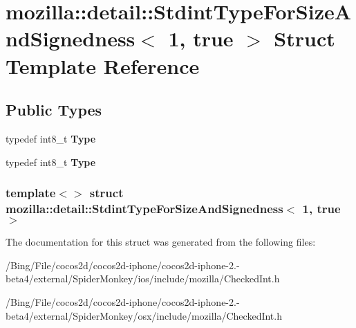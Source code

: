 \hypertarget{structmozilla_1_1detail_1_1_stdint_type_for_size_and_signedness_3_011_00_01true_01_4}{\section{mozilla\-:\-:detail\-:\-:Stdint\-Type\-For\-Size\-And\-Signedness$<$ 1, true $>$ Struct Template Reference}
\label{structmozilla_1_1detail_1_1_stdint_type_for_size_and_signedness_3_011_00_01true_01_4}
}
\subsection*{Public Types}
\begin{DoxyCompactItemize}
\item 
\hypertarget{structmozilla_1_1detail_1_1_stdint_type_for_size_and_signedness_3_011_00_01true_01_4_aefa63ece3683fa4aa9eeabbbde885f72}{typedef int8\-\_\-t {\bfseries Type}}\label{structmozilla_1_1detail_1_1_stdint_type_for_size_and_signedness_3_011_00_01true_01_4_aefa63ece3683fa4aa9eeabbbde885f72}

\item 
\hypertarget{structmozilla_1_1detail_1_1_stdint_type_for_size_and_signedness_3_011_00_01true_01_4_aefa63ece3683fa4aa9eeabbbde885f72}{typedef int8\-\_\-t {\bfseries Type}}\label{structmozilla_1_1detail_1_1_stdint_type_for_size_and_signedness_3_011_00_01true_01_4_aefa63ece3683fa4aa9eeabbbde885f72}

\end{DoxyCompactItemize}
\subsubsection*{template$<$$>$ struct mozilla\-::detail\-::\-Stdint\-Type\-For\-Size\-And\-Signedness$<$ 1, true $>$}



The documentation for this struct was generated from the following files\-:\begin{DoxyCompactItemize}
\item 
/\-Bing/\-File/cocos2d/cocos2d-\/iphone/cocos2d-\/iphone-\/2.-\/beta4/external/\-Spider\-Monkey/ios/include/mozilla/Checked\-Int.\-h\item 
/\-Bing/\-File/cocos2d/cocos2d-\/iphone/cocos2d-\/iphone-\/2.-\/beta4/external/\-Spider\-Monkey/osx/include/mozilla/Checked\-Int.\-h\end{DoxyCompactItemize}
